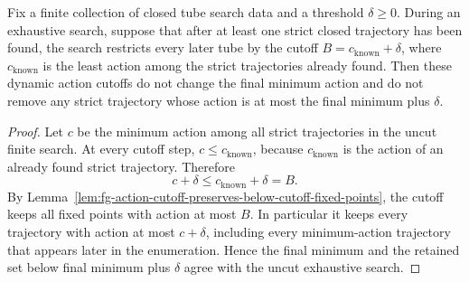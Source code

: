 \begin{unverified}
\begin{lemma}%
\label{lem:fg-dynamic-action-cutoffs-preserve-retained-output}
Fix a finite collection of closed tube search data and a threshold
\(\delta\ge0\).  During an exhaustive search, suppose that after at least one
strict closed trajectory has been found, the search restricts every later tube
by the cutoff \(B=c_{\mathrm{known}}+\delta\), where \(c_{\mathrm{known}}\) is
the least action among the strict trajectories already found.  Then these
dynamic action cutoffs do not change the final minimum action and do not remove
any strict trajectory whose action is at most the final minimum plus
\(\delta\).
\end{lemma}

\begin{proof}
Let \(c\) be the minimum action among all strict trajectories in the uncut
finite search.  At every cutoff step, \(c\le c_{\mathrm{known}}\), because
\(c_{\mathrm{known}}\) is the action of an already found strict trajectory.
Therefore
\[
  c+\delta\le c_{\mathrm{known}}+\delta=B .
\]
By Lemma~\ref{lem:fg-action-cutoff-preserves-below-cutoff-fixed-points}, the
cutoff keeps all fixed points with action at most \(B\).  In particular it
keeps every trajectory with action at most \(c+\delta\), including every
minimum-action trajectory that appears later in the enumeration.  Hence the
final minimum and the retained set below final minimum plus \(\delta\) agree
with the uncut exhaustive search.
\end{proof}
\end{unverified}

